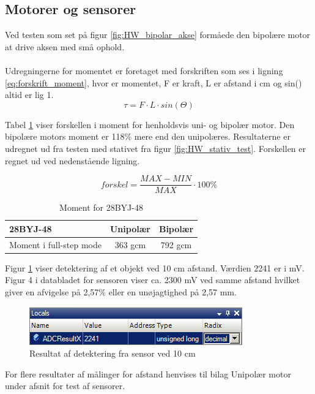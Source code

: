 \subsection{Motorer og sensorer}
Ved testen som set på figur \ref{fig:HW_bipolar_akse} formåede den bipolære motor at drive aksen med små ophold.
\\
\\
Udregningerne for momentet er foretaget med forskriften som ses i ligning \eqref{eq:forskrift_moment}, hvor \tau er momentet, F er kraft, L er afstand i cm og sin(\Theta) altid er lig 1.\\

\begin{equation} \label{eq:forskrift_moment}
	\tau = F \cdot L \cdot sin(\Theta)
\end{equation}

\noindent
Tabel \ref{tab:motor_moment} viser forskellen i moment for henholdsvis uni- og bipolær motor. Den bipolære motors moment er 118\% mere end den unipolæres. Resultaterne er udregnet ud fra testen med stativet fra figur \ref{fig:HW_stativ_test}. Forskellen er regnet ud ved nedenstående ligning.

\begin{equation} \label{eq:forskrift_forskel}
	forskel = \frac{MAX - MIN}{MAX} \cdot 100\%
\end{equation}

\begin{table}[H]
  	\centering
	\begin{tabular}{ |l|c|c| }
  		\hline
  		\textbf{28BYJ-48} & Unipolær & Bipolær\\
  		\hline
  		Moment i full-step mode & 363 gcm & 792 gcm \\
  		\hline
	\end{tabular}
	\caption[]{Moment for 28BYJ-48\footnotemark}
	\label{tab:motor_moment}
\end{table}

\noindent
Figur \ref{Sensor_10cm} viser detektering af et objekt ved 10 cm afstand. Værdien 2241 er i mV. Figur 4 i databladet for sensoren viser ca. 2300 mV ved samme afstand hvilket giver en afvigelse på 2,57\% eller en unøjagtighed på 2,57 mm.

\begin{figure}[H]
	\includegraphics[scale=1]{tex/Test/Motor-sensor/Sensor_10cm.png}
	\caption{Resultat af detektering fra sensor ved 10 cm}
	\label{Sensor_10cm}
\end{figure}

\noindent
For flere resultater af målinger for afstand henvises til bilag Unipolær motor under afsnit for test af sensorer.